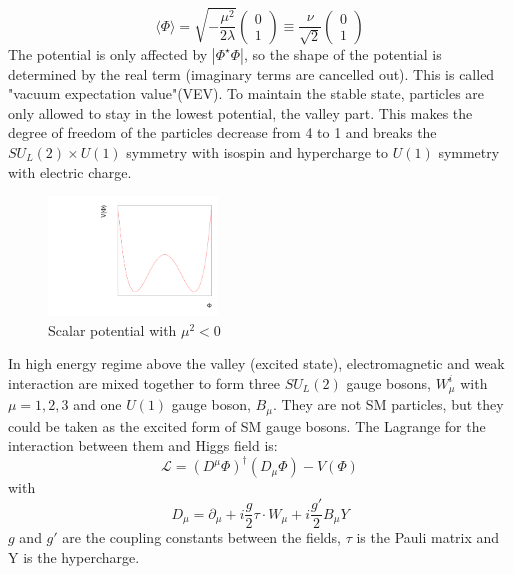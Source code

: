 \begin{equation}
\langle\Phi\rangle=\sqrt{-\frac{\mu^2}{2\lambda}}\left ( \begin{array}{c} 0 \\ 1 \end{array} \right) \equiv\frac{\nu}{\sqrt{2}}\left ( \begin{array}{c} 0 \\ 1 \end{array} \right)
\end{equation}
The potential is only affected by $|\Phi^\star\Phi|$, so the shape of the potential is determined by the real term (imaginary terms are cancelled out). This is called "vacuum expectation value"(VEV). To maintain the stable state, particles are only allowed to stay in the lowest potential, the valley part. This makes the degree of freedom of the particles decrease from 4 to 1 and breaks the $SU_L(2)\times U(1)$ symmetry with isospin and hypercharge to $U(1)$ symmetry with electric charge.  
\begin{figure}[!h]                
	\includegraphics[width=0.4\textwidth]{Chapter1/higgs.pdf}
	\centering
	\begin{center}
		\caption{Scalar potential with $\mu^2 < 0$}
		\label{Fig:higgs}            
	\end{center}
\end{figure}
In high energy regime above the valley (excited state), electromagnetic and weak interaction are mixed together to form three $SU_L(2)$ gauge bosons, $W^i_\mu$ with $\mu =1,2,3$ and one $U(1)$ gauge boson, $B_\mu$. They are not SM particles, but they could be taken as the excited form of SM gauge bosons. The Lagrange for the interaction between them and Higgs field is:
\begin{equation}
 \mathcal{L}=(D^\mu\Phi)^\dagger(D_\mu\Phi) - V(\Phi) 
\end{equation}
with
\begin{equation}
 D_\mu = \partial_\mu+i\frac{g}{2}\tau\cdot W_\mu+i\frac{g'}{2}B_\mu Y
 \label{Eq:electroweak symmetry Lagrange}  
\end{equation}
$g$ and $g'$ are the coupling constants between the fields, $\tau$ is the Pauli matrix and Y is the hypercharge.
